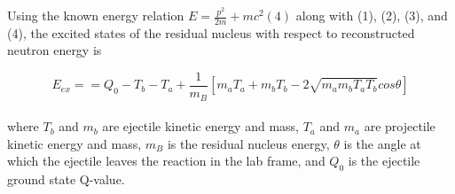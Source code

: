 \documentclass[11pt,copyright]{fsuthesis}
\begin{document}
Using the known energy relation $E = \frac{p^2}{2m} + mc^2 (4)$ along with (1), (2), (3), and (4), the excited states of the residual nucleus with respect to reconstructed neutron energy is 

\[E_{ex} = =Q_0-T_b-T_a+\frac{1}{m_B}[m_aT_a+m_bT_b-2\sqrt{m_am_bT_aT_b}cos\theta] \]
\\
where $T_b$ and $m_b$ are ejectile kinetic energy and mass, $T_a$ and $m_a$ are projectile kinetic energy and mass, $m_B$ is the residual nucleus energy, $\theta$ is the angle at which the ejectile leaves the reaction in the lab frame, and $Q_0$ is the ejectile ground state Q-value. 

\newpage
\end{document}
